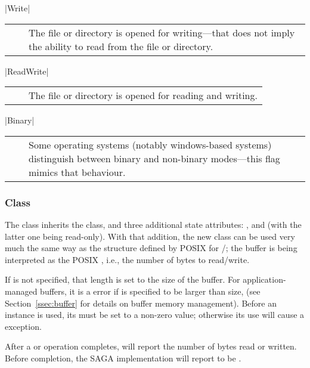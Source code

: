     |Write|\\[0.3mm]
    \begin{tabular}{cp{110mm}}
      ~~ & The file or directory is opened for writing---that does not imply the ability to read from the 
           file or directory.
    \end{tabular}

    |ReadWrite|\\[0.3mm]
    \begin{tabular}{cp{110mm}}
      ~~ & The file or directory is opened for reading 
           and writing.
    \end{tabular}

    |Binary|\\[0.3mm]
    \begin{tabular}{cp{110mm}}
      ~~ & Some operating systems (notably windows-based systems) distinguish between binary and 
           non-binary modes---this flag mimics that behaviour.
    \end{tabular}


  \subsubsection*{Class }

    The  class inherits the 
    class, and three additional state attributes: ,
     and  (with the latter one being
    read-only).  With that addition, the new class can be used
    very much the same way as the  structure defined by
    POSIX for /; the buffer  is
    being interpreted as the POSIX , i.e., the
    number of bytes to read/write.

    If  is not specified, that length is set
    to the size of the buffer.  For
    application-managed buffers, it is a  error
    if  is specified to be larger than size,  (see Section~\ref{ssec:buffer}
    for details on buffer memory management).  Before an
     instance is used, its  must be set to
    a non-zero value; otherwise its use will cause a
     exception.

    After a  or  operation
    completes,  will report the number of bytes
    read or written.  Before completion, the SAGA implementation will
    report  to be .

